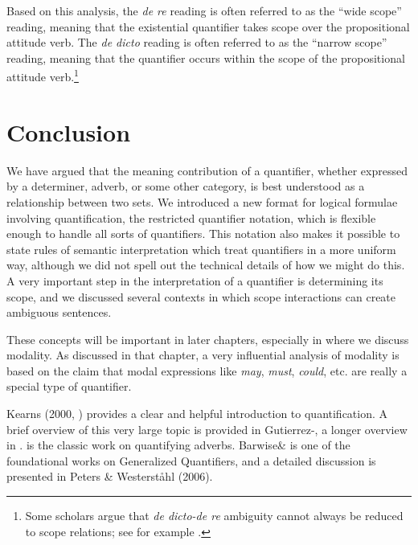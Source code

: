 Based on this analysis, the \textit{de re} reading is often referred to as the “wide scope” reading, meaning that the existential quantifier takes scope over the propositional attitude verb. The \textit{de dicto} reading is often referred to as the “narrow scope” reading, meaning that the quantifier occurs within the scope of the propositional attitude verb.\footnote{Some scholars argue that \textit{de dicto-de re} ambiguity cannot always be reduced to scope relations; see for example \citet{FodorSag1982}.}


\section{Conclusion}\label{sec:14.6}

We have argued that the meaning contribution of a quantifier, whether expressed by a determiner, adverb, or some other category, is best understood as a relationship between two sets. We introduced a new format for logical formulae involving quantification, the restricted quantifier notation, which is flexible enough to handle all sorts of quantifiers. This notation also makes it possible to state rules of semantic interpretation which treat quantifiers in a more uniform way, although we did not spell out the technical details of how we might do this. A very important step in the interpretation of a quantifier is determining its scope, and we discussed several contexts in which scope interactions can create ambiguous sentences.



These concepts will be important in later chapters, especially in  where we discuss modality. As discussed in that chapter, a very influential analysis of modality is based on the claim that modal expressions like \textit{may}, \textit{must}, \textit{could}, etc. are really a special type of quantifier.



\furtherreading



Kearns (2000, ) provides a clear and helpful introduction to quantification. A brief overview of this very large topic is provided in Gutierrez-\citet{Rexach2013}, a longer overview in \citet{Szabolcsi2015}. \citet{Lewis1975} is the classic work on quantifying adverbs. Barwise\& \citet{Cooper1981} is one of the foundational works on Generalized Quantifiers, and a detailed discussion is presented in Peters \& Westerståhl (2006).


